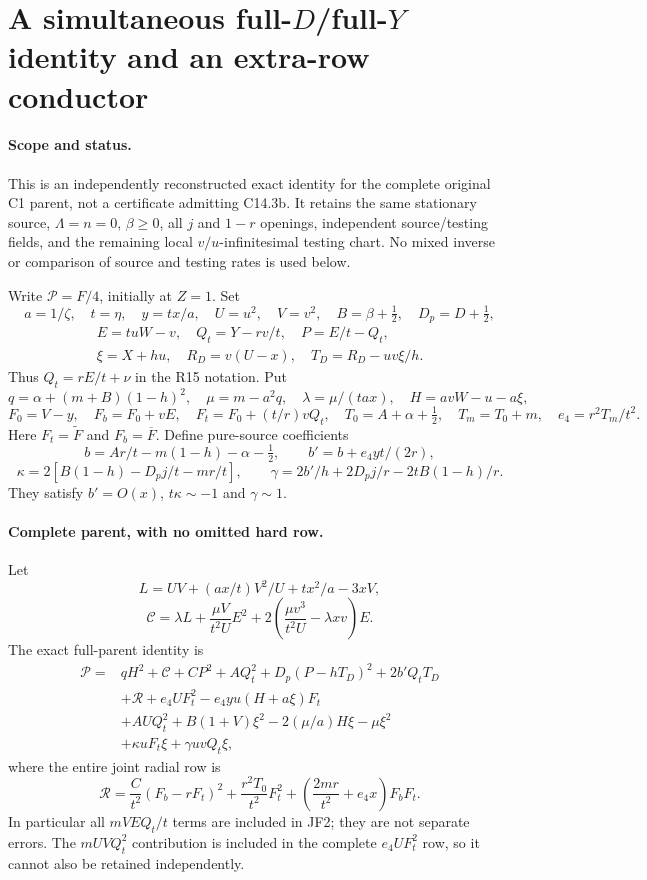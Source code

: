 \section{A simultaneous full-$D$/full-$Y$ identity and an extra-row conductor}
\paragraph{Scope and status.}
This is an independently reconstructed exact identity for the complete
original C1 parent, not a certificate admitting C14.3b. It retains the
same stationary source, $\Lambda=n=0$, $\beta\ge0$, all $j$ and $1-r$
openings, independent source/testing fields, and the remaining local
$v/u$-infinitesimal testing chart. No mixed inverse or comparison of
source and testing rates is used below.

Write $\mathcal P=F/4$, initially at $Z=1$. Set
\[
 a=1/\zeta,\quad t=\eta,\quad y=tx/a,\quad U=u^2,\quad V=v^2,
 \quad B=\beta+\tfrac12,\quad D_p=D+\tfrac12,
\]
\[
 \begin{gathered}
 E=tuW-v,\quad Q_t=Y-rv/t,\quad P=E/t-Q_t,\\
 \xi=X+hu,\quad R_D=v(U-x),\quad T_D=R_D-uv\xi/h.
 \end{gathered}
\]
Thus $Q_t=rE/t+\nu$ in the R15 notation. Put
\[
 q=\alpha+(m+B)(1-h)^2,\quad\mu=m-a^2q,
 \quad\lambda=\mu/(tax),\quad H=avW-u-a\xi,
\]
\[
 F_0=V-y,\quad F_b=F_0+vE,\quad F_t=F_0+(t/r)vQ_t,
 \quad T_0=A+\alpha+\tfrac12,\quad T_m=T_0+m,
 \quad e_4=r^2T_m/t^2.
\]
Here $F_t=\widetilde F$ and $F_b=\overline F$. Define pure-source
coefficients
\[
 b=Ar/t-m(1-h)-\alpha-\tfrac12,\qquad
 b'=b+e_4yt/(2r),
\]
\[
 \kappa=2[B(1-h)-D_pj/t-mr/t],\qquad
 \gamma=2b'/h+2D_pj/r-2tB(1-h)/r.
\]
They satisfy $b'=O(x)$, $t\kappa\sim-1$ and $\gamma\sim1$.

\paragraph{Complete parent, with no omitted hard row.}
Let
\[
 L=UV+(ax/t)V^2/U+tx^2/a-3xV,
\]
\[
 \mathscr C=\lambda L+\frac{\mu V}{t^2U}E^2
                +2\left(\frac{\mu v^3}{t^2U}-\lambda xv\right)E.
\]
The exact full-parent identity is
\begin{align*}
 \mathcal P={}&qH^2+\mathscr C
 +CP^2+AQ_t^2+D_p(P-hT_D)^2+2b'Q_tT_D\\
 &+\mathscr R+e_4UF_t^2-e_4yu(H+a\xi)F_t\\
 &+AUQ_t^2+B(1+V)\xi^2
                 -2(\mu/a)H\xi-\mu\xi^2\\
 &+\kappa uF_t\xi+\gamma uvQ_t\xi,                 \tag{JF1}
\end{align*}
where the entire joint radial row is
\[
 \mathscr R=\frac C{t^2}(F_b-rF_t)^2
       +\frac{r^2T_0}{t^2}F_t^2
       +\left(\frac{2mr}{t^2}+e_4x\right)F_bF_t.    \tag{JF2}
\]
In particular all $mVEQ_t/t$ terms are included in JF2; they are not
separate errors. The $mUVQ_t^2$ contribution is included in the complete
$e_4UF_t^2$ row, so it cannot also be retained independently.

